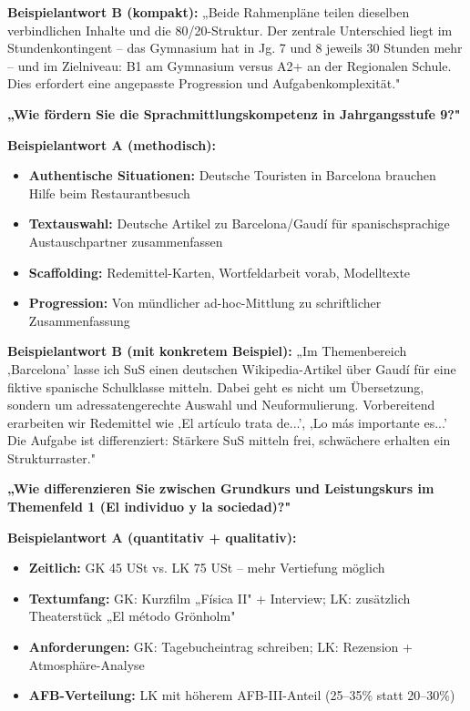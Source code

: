 \documentclass[11pt,a4paper]{article}
\begin{document}
\textbf{Beispielantwort B (kompakt):}
„Beide Rahmenpläne teilen dieselben verbindlichen Inhalte und die 80/20-Struktur. Der zentrale Unterschied liegt im Stundenkontingent -- das Gymnasium hat in Jg. 7 und 8 jeweils 30 Stunden mehr -- und im Zielniveau: B1 am Gymnasium versus A2+ an der Regionalen Schule. Dies erfordert eine angepasste Progression und Aufgabenkomplexität."

\vspace{0.4cm}

\begin{exambox}
\textbf{„Wie fördern Sie die Sprachmittlungskompetenz in Jahrgangsstufe 9?"}
\end{exambox}

\textbf{Beispielantwort A (methodisch):}
\begin{itemize}[leftmargin=0.5cm, itemsep=1pt]
\item \textbf{Authentische Situationen:} Deutsche Touristen in Barcelona brauchen Hilfe beim Restaurantbesuch
\item \textbf{Textauswahl:} Deutsche Artikel zu Barcelona/Gaudí für spanischsprachige Austauschpartner zusammenfassen
\item \textbf{Scaffolding:} Redemittel-Karten, Wortfeldarbeit vorab, Modelltexte
\item \textbf{Progression:} Von mündlicher ad-hoc-Mittlung zu schriftlicher Zusammenfassung
\end{itemize}

\textbf{Beispielantwort B (mit konkretem Beispiel):}
„Im Themenbereich ‚Barcelona' lasse ich SuS einen deutschen Wikipedia-Artikel über Gaudí für eine fiktive spanische Schulklasse mitteln. Dabei geht es nicht um Übersetzung, sondern um adressatengerechte Auswahl und Neuformulierung. Vorbereitend erarbeiten wir Redemittel wie ‚El artículo trata de...', ‚Lo más importante es...' Die Aufgabe ist differenziert: Stärkere SuS mitteln frei, schwächere erhalten ein Strukturraster."

\vspace{0.4cm}

\begin{exambox}
\textbf{„Wie differenzieren Sie zwischen Grundkurs und Leistungskurs im Themenfeld 1 (El individuo y la sociedad)?"}
\end{exambox}

\textbf{Beispielantwort A (quantitativ + qualitativ):}
\begin{itemize}[leftmargin=0.5cm, itemsep=1pt]
\item \textbf{Zeitlich:} GK 45 USt vs. LK 75 USt -- mehr Vertiefung möglich
\item \textbf{Textumfang:} GK: Kurzfilm „Física II" + Interview; LK: zusätzlich Theaterstück „El método Grönholm"
\item \textbf{Anforderungen:} GK: Tagebucheintrag schreiben; LK: Rezension + Atmosphäre-Analyse
\item \textbf{AFB-Verteilung:} LK mit höherem AFB-III-Anteil (25--35\% statt 20--30\%)
\end{itemize}
\end{document}
